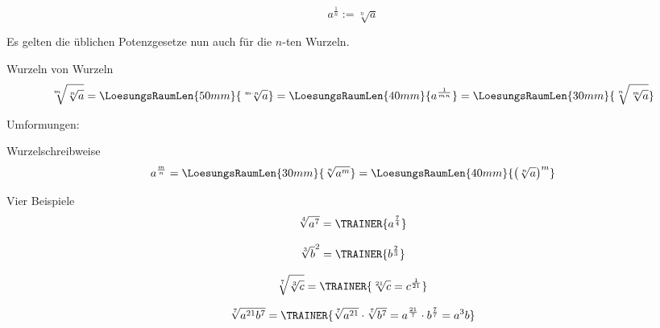 \begin{definition}{}{}
  $$a^{\frac{1}{n}} := \sqrt[n]{a}$$
\end{definition}



\newpage

Es gelten die üblichen Potenzgesetze nun auch für die $n$-ten Wurzeln.

\begin{gesetz}{Wurzeln von Wurzeln}{}
  $$\sqrt[m\,]{\sqrt[n]{a}} = \LoesungsRaumLen{50mm}{\sqrt[m\cdot
      n]{a}}=\LoesungsRaumLen{40mm}{a^\frac1{mn}} = \LoesungsRaumLen{30mm}{\sqrt[n\,]{\sqrt[m]{a}}}$$
\end{gesetz}

Umformungen:


\begin{gesetz}{Wurzelschreibweise}{}
  $$a^\frac{m}n = \LoesungsRaumLen{30mm}{\sqrt[n]{a^m}} = \LoesungsRaumLen{40mm}{\left(\sqrt[n]{a}\right)^m}$$
\end{gesetz}

\begin{beispiel}{Vier Beispiele}{}
  $$\sqrt[4]{a^7} = \TRAINER{a^\frac74}$$

  $${\sqrt[3]{b}}^2 = \TRAINER{b^{\frac23}}$$

  $$\sqrt[7]{\sqrt[3]{c}} = \TRAINER{\sqrt[21]{c} = c^\frac1{21}}$$

  $$\sqrt[7]{a^{21}b^7} = \TRAINER{
    \sqrt[7]{a^{21}}\cdot{}\sqrt[7]{b^7} =  a^{\frac{21}{7}}\cdot{}
    b^{\frac77} = a^3b }$$
  \end{beispiel}
\newpage


